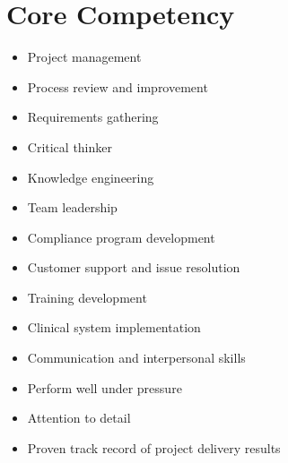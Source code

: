 \documentclass[letter,11pt,DIV=20]{scrartcl}
\begin{document}
\section{Core Competency}
\vspace{-0.75em}
\begin{multicols}{2}
{\small
\begin{itemize}[topsep=0pt,nosep,noitemsep,leftmargin=1em]
     \item Project management
     \item Process review and improvement
     \item Requirements gathering
     \item Critical thinker
     \item Knowledge engineering
     \item Team leadership
     \item Compliance program development	
     \item Customer support and issue resolution
     \item Training development
     \item Clinical system implementation
     \item Communication and interpersonal skills
     \item Perform well under pressure
     \item Attention to detail
     \item Proven track record of project delivery results
\end{itemize}
}
\end{multicols}
\end{document}
